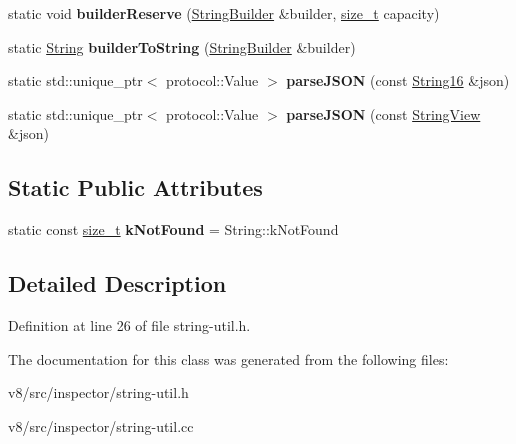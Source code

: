 \begin{DoxyCompactItemize}
\mbox{\label{classv8__inspector_1_1protocol_1_1StringUtil_ad66b98e17dc6e6181f405613eeed0e6c}} 
static void {\bfseries builder\+Reserve} (\mbox{\hyperlink{classv8__inspector_1_1String16Builder}{String\+Builder}} \&builder, \mbox{\hyperlink{classsize__t}{size\+\_\+t}} capacity)
\item 
\mbox{\label{classv8__inspector_1_1protocol_1_1StringUtil_a903fee71e6ad574c38e1ee52aaea42aa}} 
static \mbox{\hyperlink{classv8__inspector_1_1String16}{String}} {\bfseries builder\+To\+String} (\mbox{\hyperlink{classv8__inspector_1_1String16Builder}{String\+Builder}} \&builder)
\item 
\mbox{\label{classv8__inspector_1_1protocol_1_1StringUtil_a55ba35d26723b93d672db5557e5dbca5}} 
static std\+::unique\+\_\+ptr$<$ protocol\+::\+Value $>$ {\bfseries parse\+J\+S\+ON} (const \mbox{\hyperlink{classv8__inspector_1_1String16}{String16}} \&json)
\item 
\mbox{\label{classv8__inspector_1_1protocol_1_1StringUtil_aa709ecbae9c3d14b923ed24f090bb0b1}} 
static std\+::unique\+\_\+ptr$<$ protocol\+::\+Value $>$ {\bfseries parse\+J\+S\+ON} (const \mbox{\hyperlink{classv8__inspector_1_1StringView}{String\+View}} \&json)
\end{DoxyCompactItemize}
\subsection*{Static Public Attributes}
\begin{DoxyCompactItemize}
\item 
\mbox{\label{classv8__inspector_1_1protocol_1_1StringUtil_ad0221b298433be6774431a4d37c85471}} 
static const \mbox{\hyperlink{classsize__t}{size\+\_\+t}} {\bfseries k\+Not\+Found} = String\+::k\+Not\+Found
\end{DoxyCompactItemize}


\subsection{Detailed Description}


Definition at line 26 of file string-\/util.\+h.



The documentation for this class was generated from the following files\+:\begin{DoxyCompactItemize}
\item 
v8/src/inspector/string-\/util.\+h\item 
v8/src/inspector/string-\/util.\+cc\end{DoxyCompactItemize}
